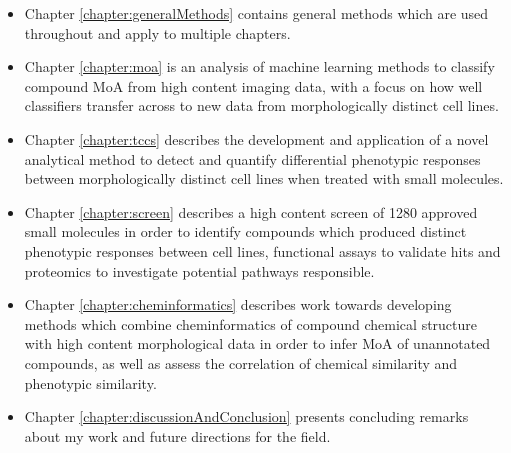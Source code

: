 \documentclass[a4paper,11pt,twoside,openright]{scrbook}
\begin{document}
\begin{itemize}
\item Chapter \ref{chapter:generalMethods} contains general methods which are used throughout and apply to multiple 
chapters.
\item Chapter \ref{chapter:moa} is an analysis of machine learning methods to classify compound MoA from high content 
imaging data, with a focus on how well classifiers transfer across to new data from morphologically distinct cell lines.
\item Chapter \ref{chapter:tccs} describes the development and application of a novel analytical method to detect and 
quantify differential phenotypic responses between morphologically distinct cell lines when treated with small 
molecules.
\item Chapter \ref{chapter:screen} describes a high content screen of 1280 approved small molecules in order to 
identify compounds which produced distinct phenotypic responses between cell lines, functional assays to validate hits 
and proteomics to investigate potential pathways responsible.
\item Chapter \ref{chapter:cheminformatics} describes work towards developing methods which combine cheminformatics of 
compound chemical structure with high content morphological data in order to infer MoA of unannotated compounds, as 
well as assess the correlation of chemical similarity and phenotypic similarity.
\item Chapter \ref{chapter:discussionAndConclusion} presents concluding remarks about my work and future directions for 
the field.
\end{itemize}
\end{document}
